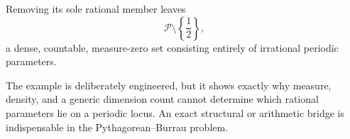\documentclass[11pt]{article}
\begin{document}
Removing its sole rational member leaves
\[
  \mathcal P\setminus\left\{\frac12\right\},
\]
a dense, countable, measure-zero set consisting entirely of irrational periodic
parameters.

\begin{center}
  \color{deepblue}
\end{center}

The example is deliberately engineered, but it shows exactly why measure,
density, and a generic dimension count cannot determine which rational
parameters lie on a periodic locus.  An exact structural or arithmetic bridge
is indispensable in the Pythagorean--Burrau problem.
\end{document}
